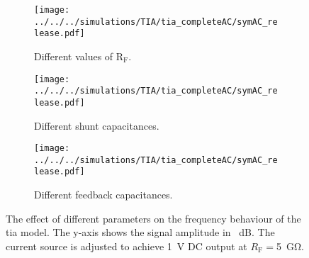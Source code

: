\begin{figure}
	\centering
	\begin{subfigure}{\textwidth}
		\centering
		\texttt{[image: ../../../simulations/TIA/tia\_completeAC/symAC\_release.pdf]}
		\caption{ Different values of R$_\text{F}$.}
		\label{fig:tia:frequency:RF}
	\end{subfigure}\hfill
	\begin{subfigure}{\textwidth}
		\centering
		\texttt{[image: ../../../simulations/TIA/tia\_completeAC/symAC\_release.pdf]}
		\caption{Different shunt capacitances.}
		\label{fig:tia:frequency:CS}
	\end{subfigure}
	\begin{subfigure}{\textwidth}
		\centering
		\texttt{[image: ../../../simulations/TIA/tia\_completeAC/symAC\_release.pdf]}
	\caption{Different feedback capacitances.}
	\label{fig:tia:frequency:CF}	
	\end{subfigure}
\caption{The effect of different parameters on the frequency behaviour of the \ac{tia} model. The y-axis shows the signal amplitude in \SI{}{\dB}. The current source is adjusted to achieve \SI{1}{\volt} DC output at $R_\text{F}=$\SI{5}{\giga\ohm}.}
\end{figure}
